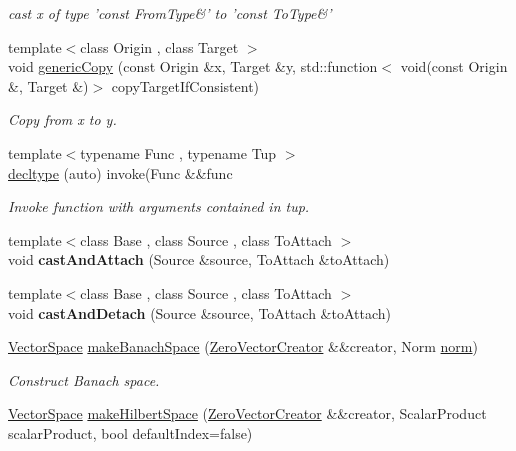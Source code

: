 \begin{DoxyCompactItemize}
\begin{DoxyCompactList}\small\item\em cast x of type 'const \-From\-Type\&' to 'const \-To\-Type\&' \end{DoxyCompactList}\item 
{\footnotesize template$<$class Origin , class Target $>$ }\\void \hyperlink{namespaceSpacy_a7dd8ce352c45e326cf8966befd5159ce}{generic\-Copy} (const \-Origin \&x, \-Target \&y, std\-::function$<$ void(const \-Origin \&, \-Target \&)$>$ copy\-Target\-If\-Consistent)
\begin{DoxyCompactList}\small\item\em \-Copy from x to y. \end{DoxyCompactList}\item 
{\footnotesize template$<$typename Func , typename Tup $>$ }\\\hyperlink{namespaceSpacy_afbcee52cc294417930c5ccfc2fefb9f8}{decltype} (auto) invoke(\-Func \&\&func
\begin{DoxyCompactList}\small\item\em \-Invoke function with arguments contained in tup. \end{DoxyCompactList}\item 
\hypertarget{namespaceSpacy_accc9a8a0cad11b10fb4453e6bea7a7e1}{{\footnotesize template$<$class Base , class Source , class To\-Attach $>$ }\\void {\bfseries cast\-And\-Attach} (\-Source \&source, \-To\-Attach \&to\-Attach)}\label{namespaceSpacy_accc9a8a0cad11b10fb4453e6bea7a7e1}

\item 
\hypertarget{namespaceSpacy_a9e6018674d6169a33a2fa75a35e2fef3}{{\footnotesize template$<$class Base , class Source , class To\-Attach $>$ }\\void {\bfseries cast\-And\-Detach} (\-Source \&source, \-To\-Attach \&to\-Attach)}\label{namespaceSpacy_a9e6018674d6169a33a2fa75a35e2fef3}

\item 
\hypertarget{namespaceSpacy_a0b66c8f2345b693504180dc7fb187958}{\hyperlink{classSpacy_1_1VectorSpace}{\-Vector\-Space} \hyperlink{namespaceSpacy_a0b66c8f2345b693504180dc7fb187958}{make\-Banach\-Space} (\hyperlink{classSpacy_1_1ZeroVectorCreator}{\-Zero\-Vector\-Creator} \&\&creator, \-Norm \hyperlink{namespaceSpacy_a86a4fc266aa19a07b0af16388907354b}{norm})}\label{namespaceSpacy_a0b66c8f2345b693504180dc7fb187958}

\begin{DoxyCompactList}\small\item\em \-Construct \-Banach space. \end{DoxyCompactList}\item 
\hypertarget{namespaceSpacy_a927756dd42df3e79c302df1f8f635b65}{\hyperlink{classSpacy_1_1VectorSpace}{\-Vector\-Space} \hyperlink{namespaceSpacy_a927756dd42df3e79c302df1f8f635b65}{make\-Hilbert\-Space} (\hyperlink{classSpacy_1_1ZeroVectorCreator}{\-Zero\-Vector\-Creator} \&\&creator, \-Scalar\-Product scalar\-Product, bool default\-Index=false)}\label{namespaceSpacy_a927756dd42df3e79c302df1f8f635b65}


\end{DoxyCompactItemize}
